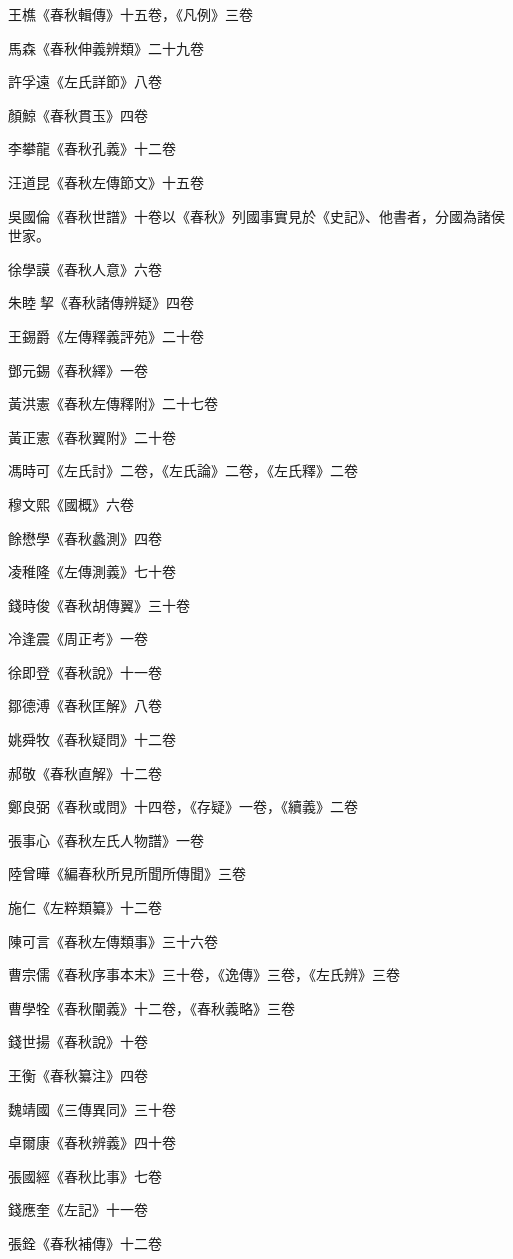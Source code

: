 王樵《春秋輯傳》十五卷，《凡例》三卷

馬森《春秋伸義辨類》二十九卷

許孚遠《左氏詳節》八卷

顏鯨《春秋貫玉》四卷

李攀龍《春秋孔義》十二卷

汪道昆《春秋左傳節文》十五卷

吳國倫《春秋世譜》十卷以《春秋》列國事實見於《史記》、他書者，分國為諸侯世家。

徐學謨《春秋人意》六卷

朱睦挈《春秋諸傳辨疑》四卷

王錫爵《左傳釋義評苑》二十卷

鄧元錫《春秋繹》一卷

黃洪憲《春秋左傳釋附》二十七卷

黃正憲《春秋翼附》二十卷

馮時可《左氏討》二卷，《左氏論》二卷，《左氏釋》二卷

穆文熙《國概》六卷

餘懋學《春秋蠡測》四卷

凌稚隆《左傳測義》七十卷

錢時俊《春秋胡傳翼》三十卷

冷逢震《周正考》一卷

徐即登《春秋說》十一卷

鄒德溥《春秋匡解》八卷

姚舜牧《春秋疑問》十二卷

郝敬《春秋直解》十二卷

鄭良弼《春秋或問》十四卷，《存疑》一卷，《續義》二卷

張事心《春秋左氏人物譜》一卷

陸曾曄《編春秋所見所聞所傳聞》三卷

施仁《左粹類纂》十二卷

陳可言《春秋左傳類事》三十六卷

曹宗儒《春秋序事本末》三十卷，《逸傳》三卷，《左氏辨》三卷

曹學牷《春秋闡義》十二卷，《春秋義略》三卷

錢世揚《春秋說》十卷

王衡《春秋纂注》四卷

魏靖國《三傳異同》三十卷

卓爾康《春秋辨義》四十卷

張國經《春秋比事》七卷

錢應奎《左記》十一卷

張銓《春秋補傳》十二卷

